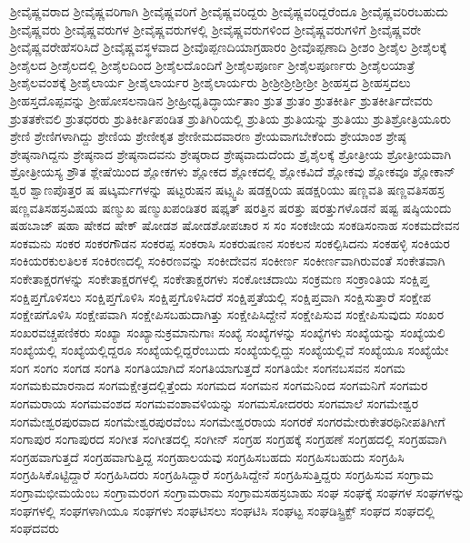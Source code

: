 {ಶ್ರೀವೈಷ್ಣವರಾದ
ಶ್ರೀವೈಷ್ಣವರಿಗಾಗಿ
ಶ್ರೀವೈಷ್ಣವರಿಗೆ
ಶ್ರೀವೈಷ್ಣವರಿದ್ದರು
ಶ್ರೀವೈಷ್ಣವರಿದ್ದರೆಂದೂ
ಶ್ರೀವೈಷ್ಣವರಿರಬಹುದು
ಶ್ರೀವೈಷ್ಣವರು
ಶ್ರೀವೈಷ್ಣವರುಗಳ
ಶ್ರೀವೈಷ್ಣವರುಗಳಲ್ಲಿ
ಶ್ರೀವೈಷ್ಣವರುಗಳಿಂದ
ಶ್ರೀವೈಷ್ಣವರುಗಳಿಗೆ
ಶ್ರೀವೈಷ್ಣವರೇ
ಶ್ರೀವೈಷ್ಣವರೇಹೆಸರಿಸಿದೆ
ಶ್ರೀವೈಷ್ಣವಸ್ಥಳವಾದ
ಶ್ರೀವೊಪ್ಪಣದಿಯಾಗ್ರಹಾರಂ
ಶ್ರೀವೊಪ್ಪಣಾದಿ
ಶ್ರೀಶಂ
ಶ್ರೀಶೈಲ
ಶ್ರೀಶೈಲಕ್ಕೆ
ಶ್ರೀಶೈಲದ
ಶ್ರೀಶೈಲದಲ್ಲಿ
ಶ್ರೀಶೈಲದಿಂದ
ಶ್ರೀಶೈಲದೊಂದಿಗೆ
ಶ್ರೀಶೈಲಪೂರ್ಣ
ಶ್ರೀಶೈಲಪೂರ್ಣರು
ಶ್ರೀಶೈಲಯಾತ್ರೆ
ಶ್ರೀಶೈಲವಂಶಕ್ಕೆ
ಶ್ರೀಶೈಲಾರ್ಯ
ಶ್ರೀಶೈಲಾರ್ಯರ
ಶ್ರೀಶೈಲಾರ್ಯರು
ಶ್ರೀಶ್ರೀಶ್ರೀಶ್ರೀಶ್ರೀ
ಶ್ರೀಹಸ್ತದ
ಶ್ರೀಹಸ್ತದಲು
ಶ್ರೀಹಸ್ತದೊಪ್ಪವನ್ನು
ಶ್ರೀಹೋಸಲನಾಡಿನ
ಶ್ರೀಹ್ರೀಧೃತಿದ್ಧಾರ್ಯತಾಂ
ಶ್ರುತ
ಶ್ರುತಂ
ಶ್ರುತಕೀರ್ತಿ
ಶ್ರುತಕೀರ್ತಿದೇವರು
ಶ್ರುತತಕೇವಲಿ
ಶ್ರುತಧರರು
ಶ್ರುತಿಕೀರ್ತಿಪಂಡಿತ
ಶ್ರುತಿಗಿರಿಯಲ್ಲಿ
ಶ್ರುತಿಯ
ಶ್ರುತಿಯನ್ನು
ಶ್ರುತಿಯು
ಶ್ರುತಿಶ್ರೋತ್ರಿಯೂರು
ಶ್ರೇಣಿ
ಶ್ರೇಣಿಗಳಾಗಿದ್ದು
ಶ್ರೇಣಿಯ
ಶ್ರೇಣೀಕೃತ
ಶ್ರೇಣೀಮದವಾರಣ
ಶ್ರೇಯವಾಗಬೇಕೆಂದು
ಶ್ರೇಯಾಂಶ
ಶ್ರೇಷ್ಠ
ಶ್ರೇಷ್ಠನಾಗಿದ್ದನು
ಶ್ರೇಷ್ಠನಾದ
ಶ್ರೇಷ್ಠನಾದವನು
ಶ್ರೇಷ್ಠರಾದ
ಶ್ರೇಷ್ಠವಾದುದೆಂದು
ಶ್ರೈಶೈಲಕ್ಕೆ
ಶ್ರೋತ್ರೀಯ
ಶ್ರೋತ್ರೀಯವಾಗಿ
ಶ್ರೋತ್ರೀಯಸ್ಯ
ಶ್ರೌತ
ಶ್ಲೇಷೆಯಿಂದ
ಶ್ಲೋಕಗಳು
ಶ್ಲೋಕದ
ಶ್ಲೋಕದಲ್ಲಿ
ಶ್ಲೋಕವಿದೆ
ಶ್ಲೋಕವು
ಶ್ಲೋಕವೂ
ಶ್ಲೋಕಾನ್
ಶ್ವರ
ಶ್ವಾಣಪೊತ್ತರ
ಷ
ಷಟ್ಕರ್ಮಗಳನ್ನು
ಷಟ್ದರುಷನ
ಷಟ್ಸ್ವಪಿ
ಷಡಕ್ಷರಿಯ
ಷಡಕ್ಷರಿಯು
ಷಣ್ಣವತಿ
ಷಣ್ಣವತಿಸಹಸ್ರ
ಷಣ್ಣವತಿಸಹಸ್ರವಿಷಯ
ಷಣ್ಮುಖ
ಷಣ್ಮುಖಪಂಡಿತರ
ಷಫ್ಕತ್
ಷರತ್ತಿನ
ಷರತ್ತು
ಷರತ್ತುಗಳೊಡನೆ
ಷಷ್ಟ
ಷಷ್ಠಿಯಂದು
ಷಹಬಾಜ್
ಷಹಾ
ಷೇಕದ
ಷೇಕ್
ಷೋಡಶ
ಷೋಡಶೋಪಚಾರ
ಸ
ಸಂ
ಸಂಕಜೀಯ
ಸಂಕಡಿಸಂನಾಹ
ಸಂಕಮದೇವನ
ಸಂಕಮನು
ಸಂಕರ
ಸಂಕರಗೌಡನ
ಸಂಕರಪ್ಪ
ಸಂಕರಾಸಿ
ಸಂಕರುಷಣನ
ಸಂಕಲನ
ಸಂಕಲ್ಪಿಸಿದನು
ಸಂಕಹಳ್ಳಿ
ಸಂಕಿಯರ
ಸಂಕಿಯರಕುಲತಿಲಕ
ಸಂಕಿರಣದಲ್ಲಿ
ಸಂಕಿರಣವನ್ನು
ಸಂಕೀದೇವನ
ಸಂಕೀರ್ಣ
ಸಂಕೀರ್ಣವಾಗಿರುವಂತೆ
ಸಂಕೇತವಾಗಿ
ಸಂಕೇತಾಕ್ಷರಗಳನ್ನು
ಸಂಕೇತಾಕ್ಷರಗಳಲ್ಲಿ
ಸಂಕೇತಾಕ್ಷರಗಳು
ಸಂಕೋಚದಾಯಿ
ಸಂಕ್ರಮಣ
ಸಂಕ್ರಾಂತಿಯ
ಸಂಕ್ಷಿಪ್ತ
ಸಂಕ್ಷಿಪ್ತಗೊಳಿಸಲು
ಸಂಕ್ಷಿಪ್ತಗೊಳಿಸಿ
ಸಂಕ್ಷಿಪ್ತಗೊಳಿಸಿದರೆ
ಸಂಕ್ಷಿಪ್ತತೆಯಲ್ಲಿ
ಸಂಕ್ಷಿಪ್ತವಾಗಿ
ಸಂಕ್ಷಿಸುತ್ತಾರೆ
ಸಂಕ್ಷೇಪ
ಸಂಕ್ಷೇಪಗೊಳಿಸಿ
ಸಂಕ್ಷೇಪವಾಗಿ
ಸಂಕ್ಷೇಪಿಸಬಹುದಾಗಿತ್ತು
ಸಂಕ್ಷೇಪಿಸಿದ್ದೇನೆ
ಸಂಕ್ಷೇಪಿಸುವ
ಸಂಕ್ಷೇಪಿಸುವುದು
ಸಂಖರ
ಸಂಖರವಚ್ಚಪಣಿಕರು
ಸಂಖ್ಯಾ
ಸಂಖ್ಯಾನುಕ್ರಮಾನುಗಾಃ
ಸಂಖ್ಯೆ
ಸಂಖ್ಯೆಗಳನ್ನು
ಸಂಖ್ಯೆಗಳು
ಸಂಖ್ಯೆಯನ್ನು
ಸಂಖ್ಯೆಯಲಿ
ಸಂಖ್ಯೆಯಲ್ಲಿ
ಸಂಖ್ಯೆಯಲ್ಲಿದ್ದರೂ
ಸಂಖ್ಯೆಯಲ್ಲಿದ್ದರೆಂಬುದು
ಸಂಖ್ಯೆಯಲ್ಲಿದ್ದು
ಸಂಖ್ಯೆಯಲ್ಲಿವೆ
ಸಂಖ್ಯೆಯೂ
ಸಂಖ್ಯೆಯೇ
ಸಂಗ
ಸಂಗಂ
ಸಂಗಡ
ಸಂಗತಿ
ಸಂಗತಿಯಾಗಿದೆ
ಸಂಗತಿಯಾಗುತ್ತದೆ
ಸಂಗತಿಯೇ
ಸಂಗನಬಸವನ
ಸಂಗಮ
ಸಂಗಮಕುಮಾರನಾದ
ಸಂಗಮಕ್ಷೇತ್ರದಲ್ಲಿತ್ತೆಂದು
ಸಂಗಮದ
ಸಂಗಮನ
ಸಂಗಮನಿಂದ
ಸಂಗಮನಿಗೆ
ಸಂಗಮರ
ಸಂಗಮರಾಯ
ಸಂಗಮವಂಶದ
ಸಂಗಮವಂಶಾವಳಿಯನ್ನು
ಸಂಗಮಸೋದರರು
ಸಂಗಮಾಲೆ
ಸಂಗಮೇಶ್ವರ
ಸಂಗಮೇಶ್ವರಪುರವಾದ
ಸಂಗಮೇಶ್ವರಪುರವೆಂಬ
ಸಂಗಮೇಶ್ವರರಾಯ
ಸಂಗರಕೆ
ಸಂಗರಮೇರುಕೇತರಥಿನೀಪತಿಗೀಗೆ
ಸಂಗಾಪುರ
ಸಂಗಾಪುರದ
ಸಂಗೀತ
ಸಂಗೀತದಲ್ಲಿ
ಸಂಗೀನ್
ಸಂಗ್ರಹ
ಸಂಗ್ರಹಕ್ಕೆ
ಸಂಗ್ರಹಣೆ
ಸಂಗ್ರಹದಲ್ಲಿ
ಸಂಗ್ರಹವಾಗಿ
ಸಂಗ್ರಹವಾಗುತ್ತದೆ
ಸಂಗ್ರಹವಾಗುತ್ತಿದ್ದ
ಸಂಗ್ರಹಾಲಯವು
ಸಂಗ್ರಹಿಸಬಹದು
ಸಂಗ್ರಹಿಸಬಹುದು
ಸಂಗ್ರಹಿಸಿ
ಸಂಗ್ರಹಿಸಿಕೊಟ್ಟಿದ್ದಾರೆ
ಸಂಗ್ರಹಿಸಿದರು
ಸಂಗ್ರಹಿಸಿದ್ದಾರೆ
ಸಂಗ್ರಹಿಸಿದ್ದೇನೆ
ಸಂಗ್ರಹಿಸುತ್ತಿದ್ದರು
ಸಂಗ್ರಹಿಸುವ
ಸಂಗ್ರಾಮ
ಸಂಗ್ರಾಮಭೀಮಯೆಂಬ
ಸಂಗ್ರಾಮರಂಗ
ಸಂಗ್ರಾಮರಾಮ
ಸಂಗ್ರಾಮಸಹಸ್ರಬಾಹು
ಸಂಘ
ಸಂಘಕ್ಕೆ
ಸಂಘಗಳ
ಸಂಘಗಳನ್ನು
ಸಂಘಗಳಲ್ಲಿ
ಸಂಘಗಳಾಗಿಯೂ
ಸಂಘಗಳು
ಸಂಘಟಿಸಲು
ಸಂಘಟಿಸಿ
ಸಂಘಟ್ಟ
ಸಂಘಡಿಸ್ಟ್ರಿಕ್ಟ್
ಸಂಘದ
ಸಂಘದಲ್ಲಿ
ಸಂಘದವರು
}
